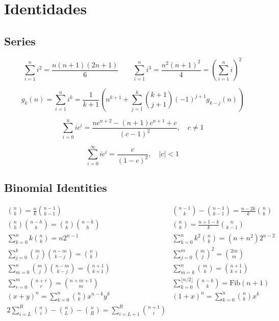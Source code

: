 \section{Identidades}

\subsection{Series}

$$\sum_{i=1}^{n} i^{2} = \frac{n(n+1)(2n+1)}{6}  \qquad  \sum_{i=1}^{n} i^{3} = \frac{n^{2}(n+1)^{2}}{4} = \left(\sum_{i=1}^n i\right)^2$$

$$ g_k(n) = \sum_{i=1}^n i^k = \frac{1}{k+1} \left( n^{k+1} + \sum_{j=1}^k \binom{k+1}{j+1} (-1)^{j+1} g_{k-j}(n) \right) $$

$$\sum_{i=0}^{n} ic^{i} = \frac{nc^{n+2} - (n+1)c^{n+1} + c}{(c-1)^{2}}, \quad c \neq 1$$

$$\sum_{i=0}^{\infty} ic^{i} = \frac{c}{(1-c)^{2}}, \quad |c| < 1$$

\subsection{Binomial Identities}

\bigskip

$$
\begin{array}{cc}
\binom{n}{k} = \frac{n}{k}\binom{n-1}{k-1}
&
\binom{n-1}{k} - \binom{n-1}{k-1} = \frac{n - 2k}{k} \binom{n}{k}
\\[10pt]
\binom{n}{h}\binom{n-h}{k} = \binom{n}{k}\binom{n-k}{h} &
\binom{n}{k} = \frac{n+1-k}{k} \binom{n}{k-1}
\\[10pt]
\sum_{k = 0}^n k\binom{n}{k} = n 2^{n-1} &
\sum_{k = 0}^n k^2 \binom{n}{k} = (n + n^2)2^{n-2}
\\[10pt]
\sum_{j = 0}^k\binom{m}{j} \binom{n-m}{k-j} = \binom{n}{k} &
\sum_{j = 0}^m \binom{m}{j}^2 = \binom{2m}{m}
\\[10pt]
\sum_{m = 0}^n \binom{m}{j} \binom{n-m}{k-j} = \binom{n+1}{k+1} &
\sum_{m = k}^n \binom{m}{k} = \binom{n+1}{k+1}
\\[10pt]
\sum_{r = 0}^m \binom{n+r}{r} = \binom{n+m+1}{m} &
\sum_{k=0}^{\lfloor n/2 \rfloor} \binom{n-k}{k} = \text{Fib}(n+1)
\\[10pt]
(x + y)^{n} = \sum_{k=0}^{n} \binom{n}{k} x^{n-k} y^{k} &
(1 + x)^{n} = \sum_{k=0}^{n} \binom{n}{k} x^{k}
\\[10pt]
2\sum_{i = L}^R \binom{n}{i} - \binom{n}{L} - \binom{n}{R} = \sum_{i = L+1}^R \binom{n+1}{i}
\end{array}
$$

